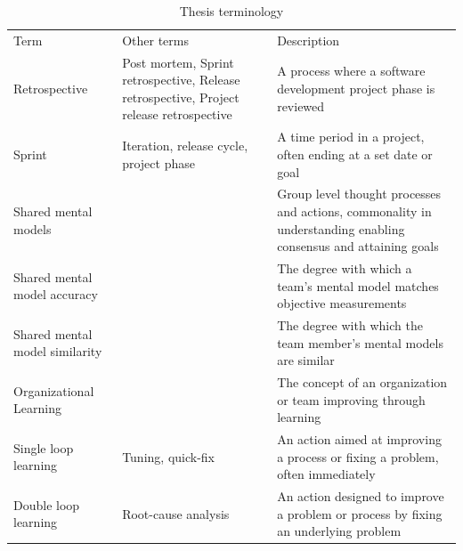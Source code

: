 \begin{table}
	\begin{centering}
		\label{table:thesis-terminology}
		\caption{Thesis terminology}
		\begin{tabular}{ p{}| p{} | p{}}
			\hline
			Term & Other terms & Description \\
			Retrospective & Post mortem, Sprint retrospective, Release retrospective, Project release retrospective & A process where a software development project phase is reviewed \\
			Sprint & Iteration, release cycle, project phase & A time period in a project, often ending at a set date or goal \\
			Shared mental models & & Group level thought processes and actions, commonality in understanding enabling consensus and attaining goals \\
			Shared mental model accuracy & & The degree with which a team's mental model matches objective measurements \\
			Shared mental model similarity & & The degree with which the team member's mental models are similar \\
			Organizational Learning & & The concept of an organization or team improving through learning \\
			Single loop learning & Tuning, quick-fix & An action aimed at improving a process or fixing a problem, often immediately \\
			Double loop learning & Root-cause analysis & An action designed to improve a problem or process by fixing an underlying problem \\

			\hline
		\end{tabular}
	\end{centering}
\end{table}





\clearpage


